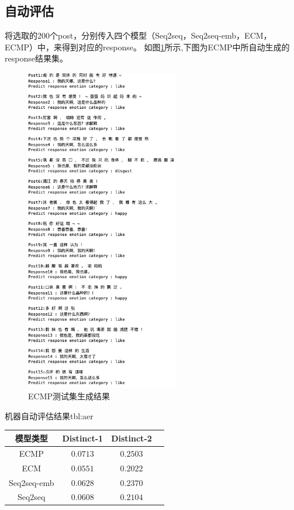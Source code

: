 \documentclass[supercite]{HustGraduPaper}
\theoremstyle{definition}
\begin{document}
\subsection{自动评估}
将选取的200个post，分别传入四个模型（Seq2seq，Seq2seq-emb，ECM，ECMP）中，来得到对应的response。
如图\ref{Fig.result}所示,下图为ECMP中所自动生成的response结果集。
\begin{figure}[H] %
  \centering %
  \includegraphics[width=0.6\textwidth]{images/result.png} %
  \caption{ECMP测试集生成结果} %
  \label{Fig.result} %
\end{figure}

\begin{generaltab}{机器自动评估结果}{tbl:aer}
  \begin{tabular}{c|ccc}
    \toprule
    模型类型 & Distinct-1 & Distinct-2 \\
    \midrule
    ECMP & $0.0713$ & $0.2503$\\
    ECM & $0.0551$ & $0.2022$\\
    Seq2seq-emb & $0.0628$ & $0.2370$\\
    Seq2seq & $0.0608$ & $0.2104$\\
    \bottomrule
  \end{tabular}
\end{generaltab}
\end{document}
